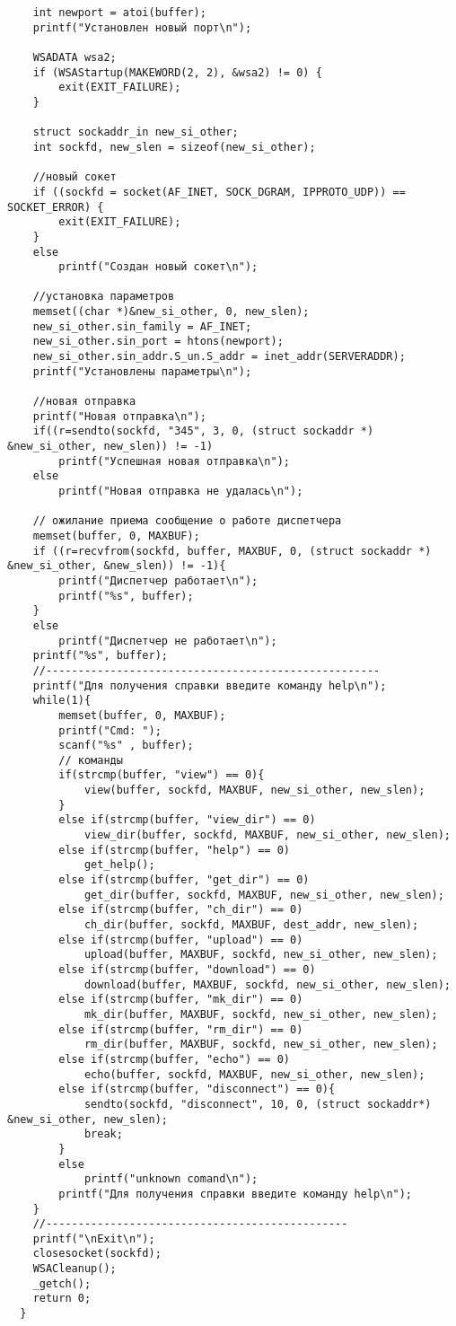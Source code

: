 \documentclass[12pt,a4paper]{report}
\begin{document}
\begin{lstlisting}
	int newport = atoi(buffer);
	printf("Установлен новый порт\n");

	WSADATA wsa2;
	if (WSAStartup(MAKEWORD(2, 2), &wsa2) != 0) {
		exit(EXIT_FAILURE);
	}

	struct sockaddr_in new_si_other;
	int sockfd, new_slen = sizeof(new_si_other);

	//новый сокет
	if ((sockfd = socket(AF_INET, SOCK_DGRAM, IPPROTO_UDP)) == SOCKET_ERROR) {
		exit(EXIT_FAILURE);
	}
	else
		printf("Создан новый сокет\n");

	//установка параметров
	memset((char *)&new_si_other, 0, new_slen);
	new_si_other.sin_family = AF_INET;
	new_si_other.sin_port = htons(newport);
	new_si_other.sin_addr.S_un.S_addr = inet_addr(SERVERADDR);
	printf("Установлены параметры\n");

	//новая отправка
	printf("Новая отправка\n");
	if((r=sendto(sockfd, "345", 3, 0, (struct sockaddr *) &new_si_other, new_slen)) != -1)
		printf("Успешная новая отправка\n");
	else
		printf("Новая отправка не удалась\n");

	// ожилание приема сообщение о работе диспетчера
	memset(buffer, 0, MAXBUF);
	if ((r=recvfrom(sockfd, buffer, MAXBUF, 0, (struct sockaddr *) &new_si_other, &new_slen)) != -1){
		printf("Диспетчер работает\n");
		printf("%s", buffer);
	}
	else
		printf("Диспетчер не работает\n");
	printf("%s", buffer);
	//----------------------------------------------------
    printf("Для получения справки введите команду help\n");
    while(1){
		memset(buffer, 0, MAXBUF);
        printf("Cmd: ");
        scanf("%s" , buffer);
        // команды
        if(strcmp(buffer, "view") == 0){
			view(buffer, sockfd, MAXBUF, new_si_other, new_slen);
		}
        else if(strcmp(buffer, "view_dir") == 0)
            view_dir(buffer, sockfd, MAXBUF, new_si_other, new_slen);
        else if(strcmp(buffer, "help") == 0)
            get_help();
        else if(strcmp(buffer, "get_dir") == 0)
            get_dir(buffer, sockfd, MAXBUF, new_si_other, new_slen);
        else if(strcmp(buffer, "ch_dir") == 0)
            ch_dir(buffer, sockfd, MAXBUF, dest_addr, new_slen);
        else if(strcmp(buffer, "upload") == 0)
            upload(buffer, MAXBUF, sockfd, new_si_other, new_slen);
		else if(strcmp(buffer, "download") == 0)
            download(buffer, MAXBUF, sockfd, new_si_other, new_slen);
        else if(strcmp(buffer, "mk_dir") == 0)
            mk_dir(buffer, MAXBUF, sockfd, new_si_other, new_slen);
        else if(strcmp(buffer, "rm_dir") == 0)
            rm_dir(buffer, MAXBUF, sockfd, new_si_other, new_slen);
		else if(strcmp(buffer, "echo") == 0)
            echo(buffer, sockfd, MAXBUF, new_si_other, new_slen);
		else if(strcmp(buffer, "disconnect") == 0){
            sendto(sockfd, "disconnect", 10, 0, (struct sockaddr*) &new_si_other, new_slen);
			break;
		}
        else
            printf("unknown comand\n");
        printf("Для получения справки введите команду help\n");
    }
	//-----------------------------------------------
	printf("\nExit\n");
    closesocket(sockfd);
    WSACleanup();
	_getch();
    return 0;
  }
\end{lstlisting}
\end{document}
